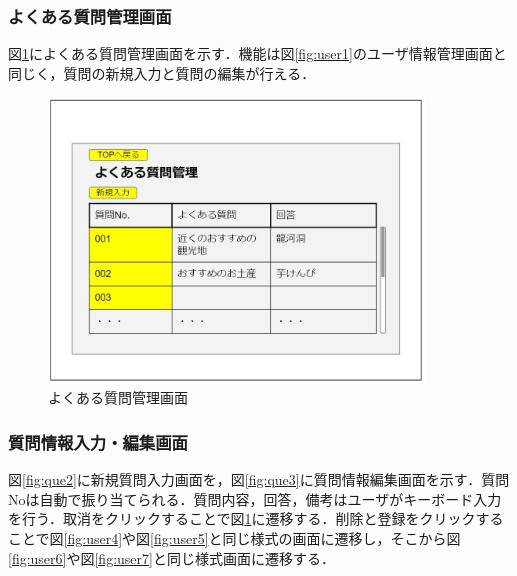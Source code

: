\documentclass[main]{subfiles}
\begin{document}
\subsubsection{よくある質問管理画面}
図\ref{fig:que1}によくある質問管理画面を示す．機能は図\ref{fig:user1}のユーザ情報管理画面と同じく，質問の新規入力と質問の編集が行える．

\begin{figure}[H]
 \centering
   \includegraphics[width=100mm]{UI-umino/que1.JPG}
 \caption{よくある質問管理画面}
 \label{fig:que1}
\end{figure}

\subsubsection{質問情報入力・編集画面}
図\ref{fig:que2}に新規質問入力画面を，図\ref{fig:que3}に質問情報編集画面を示す．質問Noは自動で振り当てられる．質問内容，回答，備考はユーザがキーボード入力を行う．取消をクリックすることで図\ref{fig:que1}に遷移する．削除と登録をクリックすることで図\ref{fig:user4}や図\ref{fig:user5}と同じ様式の画面に遷移し，そこから図\ref{fig:user6}や図\ref{fig:user7}と同じ様式画面に遷移する．
\end{document}

